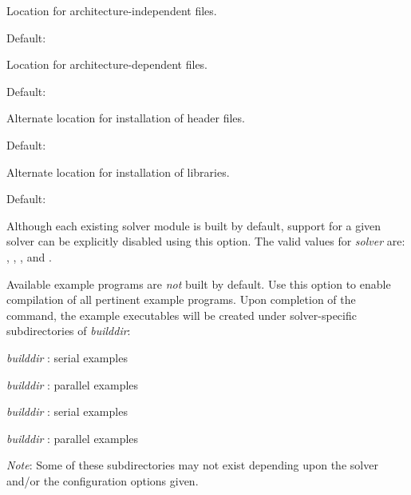 \begin{config}
  
\item {}
  
  Location for architecture-independent files.
  
  Default: 
  
\item {}

  Location for architecture-dependent files.
  
  Default: 

\item {}
  
  Alternate location for installation of header files.
  
  Default: 
  
\item {}
  
  Alternate location for installation of libraries.
  
  Default: 

\item {}

  Although each existing solver module is built by default, support for a
  given solver can be explicitly disabled using this option. 
  The valid values for {\em solver} are: , , 
  , and .

\item {}
  
  Available example programs are {\em not} built by default. Use this option
  to enable compilation of all pertinent example programs. Upon completion of 
  the  command, the example executables will be created under solver-specific
  subdirectories of {\em builddir}:
  \begin{config}
  \item {\em builddir} : serial {\C} examples
  \item {\em builddir} : parallel {\C} examples
  \item {\em builddir} : serial {\F} examples
  \item {\em builddir} : parallel {\F} examples
  \end{config}  
  {\em Note}: Some of these subdirectories may not exist depending upon the
  solver and/or the configuration options given.


\end{config}
